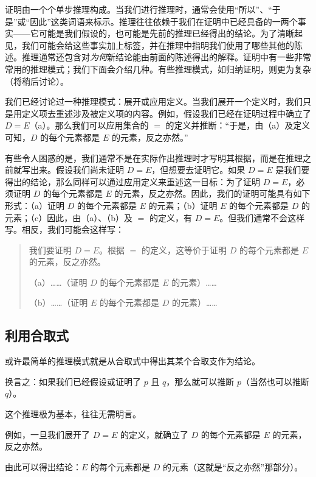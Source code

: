 \documentclass[../../../include/open-logic-section]{subfiles}
\begin{document}


证明由一个个单步推理构成。当我们进行推理时，通常会使用“所以”、“于是”或“因此”这类词语来标示。推理往往依赖于我们在证明中已经具备的一两个事实——它可能是我们假设的，也可能是先前的推理已经得出的结论。为了清晰起见，我们可能会给这些事实加上标签，并在推理中指明我们使用了哪些其他的陈述。推理通常还包含对\emph{为何}新结论能由前面的陈述得出的解释。证明中有一些非常常用的推理模式；我们下面会介绍几种。有些推理模式，如归纳证明，则更为复杂（将稍后讨论）。

我们已经讨论过一种推理模式：展开或应用定义。当我们展开一个定义时，我们只是用定义项去重述涉及被定义项的内容。例如，假设我们已经在证明过程中确立了 $D = E$（a）。那么我们可以应用集合的 $=$ 的定义并推断：“于是，由（a）及定义可知，$D$ 的每个元素都是 $E$ 的元素，反之亦然。”

有些令人困惑的是，我们通常不是在实际作出推理时才写明其根据，而是在推理之前就写出来。假设我们尚未证明 $D = E$，但想要去证明它。如果 $D = E$ 是我们要得出的结论，那么同样可以通过应用定义来重述这一目标：为了证明 $D = E$，必须证明 $D$ 的每个元素都是 $E$ 的元素，反之亦然。因此，我们的证明可能具有如下形式：（a）证明 $D$ 的每个元素都是 $E$ 的元素；（b）证明 $E$ 的每个元素都是 $D$ 的元素；（c）因此，由（a）、（b）及 $=$ 的定义，有 $D = E$。但我们通常不会这样写。相反，我们可能会这样写：

\begin{quote}
我们要证明 $D = E$。根据 $=$ 的定义，这等价于证明 $D$ 的每个元素都是 $E$ 的元素，反之亦然。

（a）……（证明 $D$ 的每个元素都是 $E$ 的元素）……

（b）……（证明 $E$ 的每个元素都是 $D$ 的元素）……
\end{quote}

\subsection{利用合取式}

或许最简单的推理模式就是从合取式中得出其某个合取支作为结论。

换言之：如果我们已经假设或证明了 $p$ 且 $q$，那么就可以推断 $p$（当然也可以推断 $q$）。

这个推理极为基本，往往无需明言。

例如，一旦我们展开了 $D = E$ 的定义，就确立了 $D$ 的每个元素都是 $E$ 的元素，反之亦然。

由此可以得出结论：$E$ 的每个元素都是 $D$ 的元素（这就是“反之亦然”那部分）。
\end{document}
